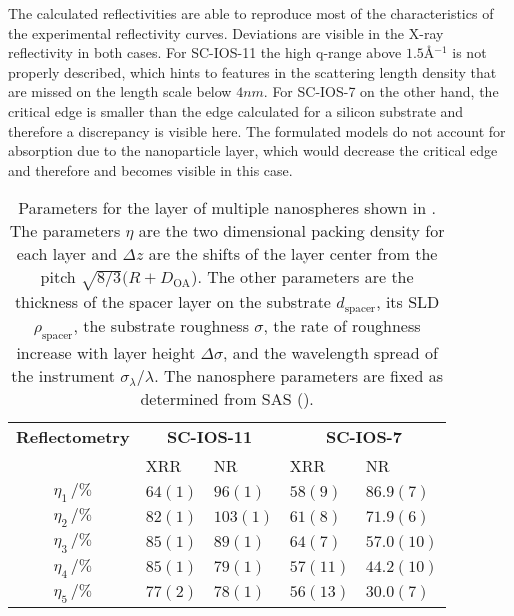 \documentclass[\main/dresen_thesis.tex]{subfiles}
\begin{document}
  The calculated reflectivities are able to reproduce most of the characteristics of the experimental reflectivity curves.
  Deviations are visible in the X-ray reflectivity in both cases.
  For SC-IOS-11 the high q-range above $1.5 \unit{\angstrom^{-1}}$ is not properly described, which hints to features in the scattering length density that are missed on the length scale below $4 \unit{nm}$.
  For SC-IOS-7 on the other hand, the critical edge is smaller than the edge calculated for a silicon substrate and therefore a discrepancy is visible here.
  The formulated models do not account for absorption due to the nanoparticle layer, which would decrease the critical edge and therefore and becomes visible in this case.

  \begin{table}[!htbp]
    \centering
    \caption{\label{tab:looselyPackedNP:layers:reflectivity}Parameters for the layer of multiple nanospheres shown in . The parameters $\eta$ are the two dimensional packing density for each layer and $\Delta z$ are the shifts of the layer center from the pitch $\sqrt{8/3} (R+D_\mathrm{OA}$). The other parameters are the thickness of the spacer layer on the substrate $d_\mathrm{spacer}$, its SLD $\rho_\mathrm{spacer}$, the substrate roughness $\sigma$, the rate of roughness increase with layer height $\Delta \sigma$, and the wavelength spread of the instrument $\sigma_\lambda / \lambda$. The nanosphere parameters are fixed as determined from SAS ().}
    \begin{tabular}{ c | l | l | l | l}
      \rule{0pt}{2ex} \textbf{Reflectometry}  & \multicolumn{2}{c}{\textbf{SC-IOS-11}} & \multicolumn{2}{c}{\textbf{SC-IOS-7}} \\
      \rule{0pt}{2ex}                   & XRR       & NR             & XRR         & NR \\
      \hline
       $\eta_1     \, / \unit{\%}$      & $64(1)$   & $96(1)$        & $58(9)$     & $86.9(7)$ \\
       $\eta_2     \, / \unit{\%}$      & $82(1)$   & $103(1)$       & $61(8)$     & $71.9(6)$ \\
       $\eta_3     \, / \unit{\%}$      & $85(1)$   & $89(1)$        & $64(7)$     & $57.0(10)$\\
       $\eta_4     \, / \unit{\%}$      & $85(1)$   & $79(1)$        & $57(11)$    & $44.2(10)$\\
       $\eta_5     \, / \unit{\%}$      & $77(2)$   & $78(1)$        & $56(13)$    & $30.0(7)$ \\

\end{tabular}
\end{table}
\end{document}
